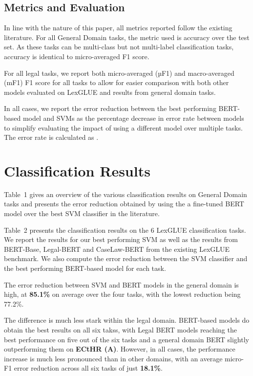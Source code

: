 \documentclass{IOS-Book-Article}
\begin{document}
\subsection{Metrics and Evaluation}

In line with the nature of this paper, all metrics reported follow the existing literature. For all General Domain tasks, the metric used is accuracy over the test set. As these tasks can be multi-class but not multi-label classification tasks, accuracy is identical to micro-averaged F1 score. \cite{f1}

For all legal tasks, we report both micro-averaged (µF1) and macro-averaged (mF1) F1 score for all tasks to allow for easier comparison with both other models evaluated on LexGLUE and results from general domain tasks.

In all cases, we report the error reduction between the best performing BERT-based model and SVMs as the percentage decrease in error rate between models to simplify evaluating the impact of using a different model over multiple tasks. The error rate is calculated as .


\section{Classification Results}
Table~1 gives an overview of the various classification results on General Domain tasks and presents the error reduction obtained by using the a fine-tuned BERT model over the best SVM classifier in the literature.

Table~2 presents the classification results on the 6 LexGLUE classification tasks. We report the results for our best performing SVM as well as the results from BERT-Base, Legal-BERT and CaseLaw-BERT from the existing LexGLUE benchmark. We also compute the error reduction between the SVM classifier and the best performing BERT-based model for each task.

The error reduction between SVM and BERT models in the general domain is  high, at \textbf{85.1\%} on average over the four tasks, with the lowest reduction being 77.2\%.

The difference is much less stark within the legal domain. BERT-based models do obtain the best results on all six takss, with Legal BERT models reaching the best performance on five out of the six tasks and a general domain BERT slightly outperforming them on \textbf{ECtHR (A)}. However, in all cases, the performance increase is much less pronounced than in other domains, with an average micro-F1 error reduction across all six tasks of just \textbf{18.1\%}.
\end{document}
